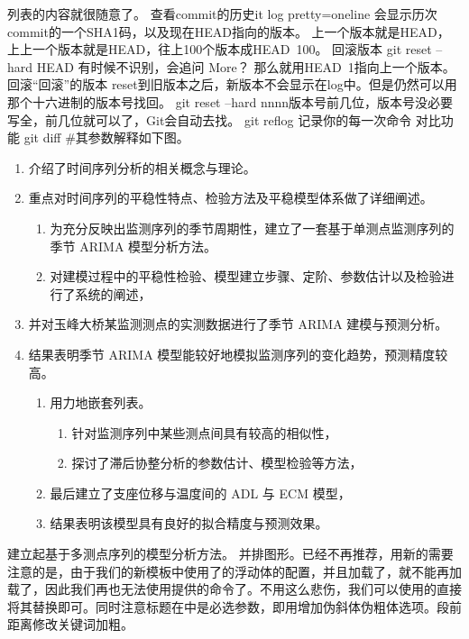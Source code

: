 \documentclass[../Main/thesis]{subfiles}
\begin{document}
列表的内容就很随意了。
查看commit的历史it log pretty=oneline 会显示历次commit的一个SHA1码，以及现在HEAD指向的版本。
上一个版本就是HEAD，上上一个版本就是HEAD，往上100个版本成HEAD~100。
回滚版本 git reset --hard HEAD
有时候不识别，会追问 More？ 那么就用HEAD~1指向上一个版本。
回滚“回滚”的版本 reset到旧版本之后，新版本不会显示在log中。但是仍然可以用那个十六进制的版本号找回。
git reset --hard nnnn版本号前几位，版本号没必要写全，前几位就可以了，Git会自动去找。 git reflog 记录你的每一次命令
对比功能 git diff \#其参数解释如下图。

\begin{enumerate}
  \item 介绍了时间序列分析的相关概念与理论。
  \item 重点对时间序列的平稳性特点、检验方法及平稳模型体系做了详细阐述。
  \begin{enumerate}
    \item 为充分反映出监测序列的季节周期性，建立了一套基于单测点监测序列的季节 ARIMA 模型分析方法。
    \item 对建模过程中的平稳性检验、模型建立步骤、定阶、参数估计以及检验进行了系统的阐述，
  \end{enumerate}
  \item 并对玉峰大桥某监测测点的实测数据进行了季节 ARIMA 建模与预测分析。
  \item 结果表明季节 ARIMA 模型能较好地模拟监测序列的变化趋势，预测精度较高。
  \begin{enumerate}
    \item 用力地嵌套列表。
    \begin{enumerate}
      \item 针对监测序列中某些测点间具有较高的相似性，
      \item 探讨了滞后协整分析的参数估计、模型检验等方法，
    \end{enumerate}
    \item 最后建立了支座位移与温度间的 ADL 与 ECM 模型，
    \item 结果表明该模型具有良好的拟合精度与预测效果。
  \end{enumerate}
\end{enumerate}

建立起基于多测点序列的模型分析方法。
并排图形。已经不再推荐，用新的需要注意的是，由于我们的新模板中使用了的浮动体的配置，并且加载了，就不能再加载了，因此我们再也无法使用提供的命令了。不用这么悲伤，我们可以使用的直接将其替换即可。同时注意标题在中是必选参数，即用增加伪斜体伪粗体选项。段前距离修改关键词加粗。
\end{document}
